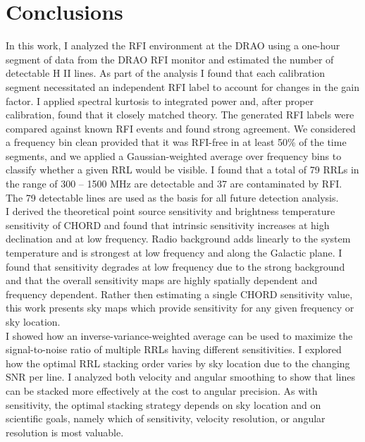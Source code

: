 \section{Conclusions}

In this work, I analyzed the RFI environment at the DRAO using a one-hour segment of data from the DRAO RFI monitor and estimated the number of detectable H II lines. As part of the analysis I found that each calibration segment necessitated an independent RFI label to account for changes in the gain factor. I applied spectral kurtosis to integrated power and, after proper calibration, found that it closely matched theory. The generated RFI labels were compared against known RFI events and found strong agreement. We considered a frequency bin clean provided that it was RFI-free in at least 50\% of the time segments, and we applied a Gaussian-weighted average over frequency bins to classify whether a given RRL would be visible. I found that a total of 79 RRLs in the range of 300 -- 1500 MHz are detectable and 37 are contaminated by RFI. The 79 detectable lines are used as the basis for all future detection analysis.\\

I derived the theoretical point source sensitivity and brightness temperature sensitivity of CHORD and found that intrinsic sensitivity increases at high declination and at low frequency. Radio background adds linearly to the system temperature and is strongest at low frequency and along the Galactic plane. I found that sensitivity degrades at low frequency due to the strong background and that the overall sensitivity maps are highly spatially dependent and frequency dependent. Rather then estimating a single CHORD sensitivity value, this work presents sky maps which provide sensitivity for any given frequency or sky location.\\

I showed how an inverse-variance-weighted average can be used to maximize the signal-to-noise ratio of multiple RRLs having different sensitivities. I explored how the optimal RRL stacking order varies by sky location due to the changing SNR per line. I analyzed both velocity and angular smoothing to show that lines can be stacked more effectively at the cost to angular precision. As with sensitivity, the optimal stacking strategy depends on sky location and on scientific goals, namely which of sensitivity, velocity resolution, or angular resolution is most valuable.\\

